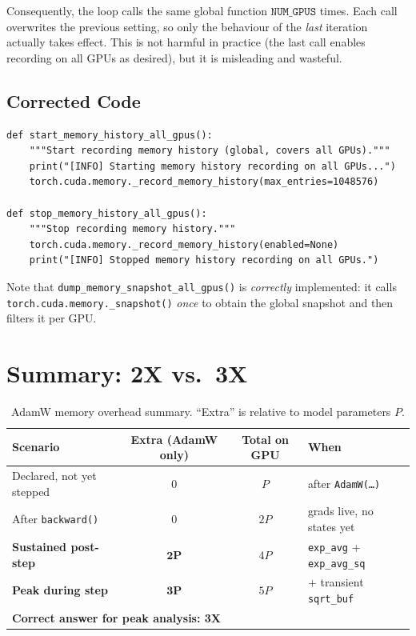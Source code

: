 \documentclass[11pt,a4paper]{article}
\begin{document}
Consequently, the loop calls the same global function $\mathtt{NUM\_GPUS}$
times.  Each call overwrites the previous setting, so only the behaviour
of the \emph{last} iteration actually takes effect.  This is not harmful
in practice (the last call enables recording on all GPUs as desired), but
it is misleading and wasteful.

\subsection{Corrected Code}

\begin{lstlisting}[caption={Corrected implementation.}]
def start_memory_history_all_gpus():
    """Start recording memory history (global, covers all GPUs)."""
    print("[INFO] Starting memory history recording on all GPUs...")
    torch.cuda.memory._record_memory_history(max_entries=1048576)

def stop_memory_history_all_gpus():
    """Stop recording memory history."""
    torch.cuda.memory._record_memory_history(enabled=None)
    print("[INFO] Stopped memory history recording on all GPUs.")
\end{lstlisting}

Note that \texttt{dump\_memory\_snapshot\_all\_gpus()} is \emph{correctly}
implemented: it calls \texttt{torch.cuda.memory.\_snapshot()} \emph{once}
to obtain the global snapshot and then filters it per GPU.

\section{Summary: 2X vs.\ 3X}
\label{sec:summary}

\begin{table}[h]
\centering
\caption{AdamW memory overhead summary.  ``Extra'' is relative to model
parameters $P$.}
\label{tab:summary}
\begin{tabular}{lccl}
\toprule
\textbf{Scenario} & \textbf{Extra (AdamW only)} & \textbf{Total on GPU} & \textbf{When} \\
\midrule
Declared, not yet stepped & $0$   & $P$          & after \texttt{AdamW(\ldots)} \\
After \texttt{backward()}  & $0$   & $2P$         & grads live, no states yet \\
\textbf{Sustained post-step} & $\mathbf{2P}$ & $4P$ & \texttt{exp\_avg} + \texttt{exp\_avg\_sq} \\
\textbf{Peak during step}    & $\mathbf{3P}$ & $5P$ & $+$ transient \texttt{sqrt\_buf} \\
\midrule
\multicolumn{4}{l}{\textbf{Correct answer for peak analysis: 3X}} \\
\bottomrule
\end{tabular}
\end{table}
\end{document}
